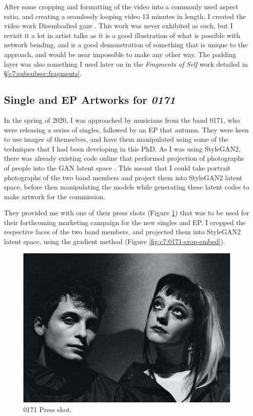 After some cropping and formatting of the video into a commonly used aspect ratio, and creating a seamlessly looping video 13 minutes in length, I created the video work Disembodied gaze \citep{broad2020disembodied}. 
This work was never exhibited as such, but I revisit it a lot in artist talks as it is a good illustration of what is possible with network bending, and is a good demonstration of something that is unique to the approach, and would be near impossible to make any other way. 
The padding layer was also something I used later on in the \textit{Fragments of Self} work detailed in \S \ref{c7:subsubsec:fragments}.

\subsection{Single and EP Artworks for \textit{0171}}
\label{c7:subsubsec:0171}

In the spring of 2020, I was approached by musicians from the band 0171, who were releasing a series of singles, followed by an EP that autumn. 
They were keen to use images of themselves, and have them manipulated using some of the techniques that I had been developing in this PhD.
As I was using StyleGAN2, there was already existing code online that performed projection of photographs of people into the GAN latent space \citep{abdal2019image2stylegan}.
This meant that I could take portrait photographs of the two band members and project them into StyleGAN2 latent space, before then manipulating the models while generating these latent codes to make artwork for the commission. 

They provided me with one of their press shots (Figure \ref{fig:c7:0171-press-shot})  that was to be used for their forthcoming marketing campaign for the new singles and EP. 
I cropped the respective faces of the two band members, and projected them into StyleGAN2 latent space, using the gradient method \citep{abdal2019image2stylegan} (Figure \ref{fig:c7:0171-crop-embed}).

\begin{figure}[!htb]
    \centering
    \captionsetup{justification=centering}
    \includegraphics[width=1\textwidth]{figures/c7_impact/0171/press/0171-press-shot.png}
    \caption{0171 Press shot.}
    \label{fig:c7:0171-press-shot}
\end{figure}


